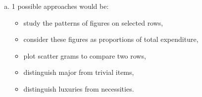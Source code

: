 \documentclass[a4paper,12pt]{article}
\begin{document}


\begin{enumerate}[(a)]
    \item 1 possible approaches would be:
\begin{itemize}
\item study the patterns of figures on selected rows,
\item consider these figures as proportions of total expenditure,
\item plot scatter grams to compare two rows,
\item distinguish major from trivial items,
\item distinguish luxuries from necessities.
\end{itemize}


\end{enumerate}
\end{document}
